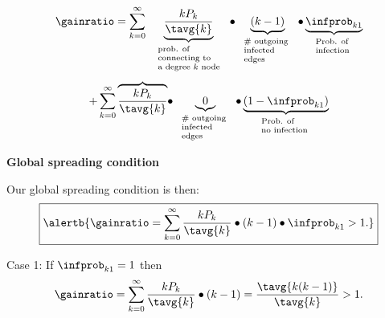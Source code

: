     $$
    \gainratio
    =
    \sum_{k=0}^{\infty}
    {
      \underbrace{
        \frac{kP_k}{\tavg{k}}
      }_{
        \mbox{ \scriptsize
          \begin{tabular}{l}
            prob. of\\
            connecting to \\
            a degree $k$ node\\
          \end{tabular}
        }
      }
    }
    {
      \bullet
      \underbrace{
        (k-1)
      }_{
        \mbox{\scriptsize
          \begin{tabular}{l}
            \# outgoing \\
            infected \\
            edges
          \end{tabular}
        }
      }
    }
    {
      \bullet
      \underbrace{
        \infprob_{k1}
      }_{
        \mbox{\scriptsize
          \begin{tabular}{l}
            Prob. of \\
            infection
          \end{tabular}
        }
      }
    }
    $$
    $$
    {
      +
      \sum_{k=0}^{\infty}
      \overbrace{
        \frac{kP_k}{\tavg{k}}
      }
    }
    {
      \bullet
      \underbrace{0}_{
        \mbox{\scriptsize
          \begin{tabular}{l}
            \# outgoing \\
            infected \\
            edges
          \end{tabular}
        }
      }
    }
    {
      \bullet
      \underbrace{
        (1-\infprob_{k1})
      }_{
        \mbox{\scriptsize
          \begin{tabular}{l}
            Prob. of \\
            no infection
          \end{tabular}
        }
      }
    }
    $$      
      
    
  \textbf{Global spreading condition}

  
   
    Our global spreading condition is then:
    $$
    \boxed{
      \alertb{
        \gainratio
        =
        \sum_{k=0}^{\infty}
        \frac{kP_k}{\tavg{k}}
        \bullet
        (k-1)
        \bullet
        \infprob_{k1}
        > 1.
        }
      }
    $$
  
    \alert{Case 1:}
    {
      If $\infprob_{k1}=1$ 
    }
    {
      then
      $$
      \gainratio = 
        \sum_{k=0}^{\infty}
        \frac{kP_k}{\tavg{k}}
        \bullet
        (k-1)
        =
        \frac{\tavg{k(k-1)}}{\tavg{k}} > 1.
      $$
    }
  
